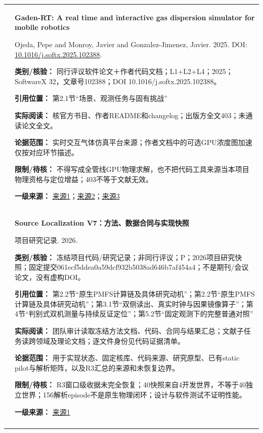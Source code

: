 \begin{longtable}{@{}>{\raggedright\arraybackslash}p{0.7cm}>{\raggedright\arraybackslash}p{14.8cm}@{}}
22 & \textbf{Gaden-RT: A real time and interactive gas dispersion simulator for mobile robotics}\par Ojeda, Pepe and Monroy, Javier and Gonzalez-Jimenez, Javier. 2025. DOI: \url{10.1016/j.softx.2025.102388}. \par\textbf{类别/核验：} 同行评议软件论文＋作者代码文档；L1+L2+L4；2025；SoftwareX 32，文章号102388；DOI 10.1016/j.softx.2025.102388。\par\textbf{引用位置：} 第2.1节“场景、观测任务与固有挑战”\par\textbf{实际阅读：} 核官方书目、作者README和changelog；出版方全文403；未通读论文全文。\par\textbf{论据范围：} 实时交互气体仿真平台来源；作者文档中的可选GPU浓度图加速仅按对应环节描述。\par\textbf{限制/待核：} 不得写成全管线GPU物理求解，也不把代码工具来源当本项目物理资格与定位增益；403不等于文献无效。\par\textbf{一级来源：} \href{https://www.sciencedirect.com/science/article/pii/S2352711025003541}{来源1}；\href{https://github.com/MAPIRlab/gaden}{来源2}；\href{https://github.com/MAPIRlab/gaden/blob/humble/Changelog.md}{来源3} \\\addlinespace[6pt]
23 & \textbf{Source Localization V7：方法、数据合同与实现快照}\par 项目研究记录. 2026. \par\textbf{类别/核验：} 冻结项目代码/研究记录；非同行评议；P；2026项目研究快照；固定提交061ecf5ddea0a59dcf932b5038ad646b7af454a4；不是期刊/会议论文，没有虚构DOI。\par\textbf{引用位置：} 第2.2节“原生PMFS计算链及具体研究动机”；第2.2节“原生PMFS计算链及具体研究动机”；第3.1节“双侧读出、真实时钟与因果镜像算子”；第4节“判别式双机测量与持续反证定位”；第5.2节“固定观测下的完整普通对照”\par\textbf{实际阅读：} 团队审计读取冻结方法文档、代码、合同与结果汇总；文献子任务读跨领域及理论文档；逐文件身份见代码证据清单。\par\textbf{论据范围：} 用于实现状态、固定核库、代码来源、研究原型、已有static pilot与解析矩阵，以及R3汇总的来源和未恢复边界。\par\textbf{限制/待核：} R3窗口级收据未完全恢复；40快照来自4开发世界，不等于40独立世界；156解析episode不是原生物理闭环；设计与软件测试不证明性能。\par\textbf{一级来源：} \href{https://github.com/kris-yun/uav-gsl-isj/tree/061ecf5ddea0a59dcf932b5038ad646b7af454a4/research/source_localization_v7}{来源1} \\\addlinespace[6pt]

\end{longtable}
